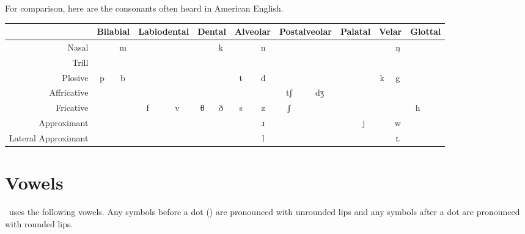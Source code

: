 For comparison, here are the consonants often heard in American English.

\begin{center}
\newcommand{\head}{\fontsize{7pt}{7pt}\selectfont}
\begin{tabular}{|r|cc|cc|cccccc|cc|cc|cc|}\hline
&
\multicolumn{2}{|c|}{\head Bilabial}&
\multicolumn{2}{|c|}{\head Labiodental}&
\multicolumn{2}{|c|}{\head Dental}&
\multicolumn{2}{|c|}{\head Alveolar}&
\multicolumn{2}{|c|}{\head Postalveolar}&
\multicolumn{2}{|c|}{\head Palatal}&
\multicolumn{2}{|c|}{\head Velar}&
\multicolumn{2}{|c|}{\head Glottal}\\\hline
              {\head Nasal}& &m& & & &k& &n& & & & & &ŋ&\cellcolor{gray}&\cellcolor{gray}\\\hline
              {\head Trill}& & & & & & & & & & & & &\cellcolor{gray}&\cellcolor{gray}&\cellcolor{gray}&\cellcolor{gray}\\\hline
            {\head Plosive}&p&b& & & & &t&d& & & & &k&g& &\cellcolor{gray}\\\hline
        {\head Affricative}& & & & & &\multicolumn{1}{c|}{}&\multicolumn{1}{|c}{}&\multicolumn{1}{c|}{}&\multicolumn{1}{|c}{tʃ}&dʒ& & & & & &\cellcolor{gray}\\\hline
          {\head Fricative}& & &f&v&θ&\multicolumn{1}{c|}{ð}&\multicolumn{1}{|c}{s}&\multicolumn{1}{c|}{z}&\multicolumn{1}{|c}{ʃ}& & & & & &h&\\\hline
        {\head Approximant}& & & & & & & &ɹ& & & &j& &w&\cellcolor{gray}&\cellcolor{gray}\\\hline
{\head Lateral Approximant}&\cellcolor{gray}&\cellcolor{gray}&\cellcolor{gray}&\cellcolor{gray}&&&&l&&&&&&ʟ&\cellcolor{gray}&\cellcolor{gray}\\\hline
\end{tabular}
\end{center}

\eject

\section{Vowels}

\LanguageName\ uses the following vowels.
Any symbols before a dot (\textbullet) are pronounced with unrounded lips and any symbols after a dot are pronounced with rounded lips.

